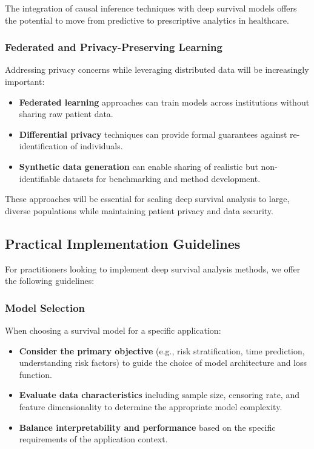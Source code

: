 The integration of causal inference techniques with deep survival models offers the potential to move from predictive to prescriptive analytics in healthcare.

\subsubsection{Federated and Privacy-Preserving Learning}

Addressing privacy concerns while leveraging distributed data will be increasingly important:

\begin{itemize}
    \item \textbf{Federated learning} approaches can train models across institutions without sharing raw patient data.

    \item \textbf{Differential privacy} techniques can provide formal guarantees against re-identification of individuals.

    \item \textbf{Synthetic data generation} can enable sharing of realistic but non-identifiable datasets for benchmarking and method development.
\end{itemize}

These approaches will be essential for scaling deep survival analysis to large, diverse populations while maintaining patient privacy and data security.

\subsection{Practical Implementation Guidelines}

For practitioners looking to implement deep survival analysis methods, we offer the following guidelines:

\subsubsection{Model Selection}

When choosing a survival model for a specific application:

\begin{itemize}
    \item \textbf{Consider the primary objective} (e.g., risk stratification, time prediction, understanding risk factors) to guide the choice of model architecture and loss function.

    \item \textbf{Evaluate data characteristics} including sample size, censoring rate, and feature dimensionality to determine the appropriate model complexity.

    \item \textbf{Balance interpretability and performance} based on the specific requirements of the application context.
\end{itemize}

